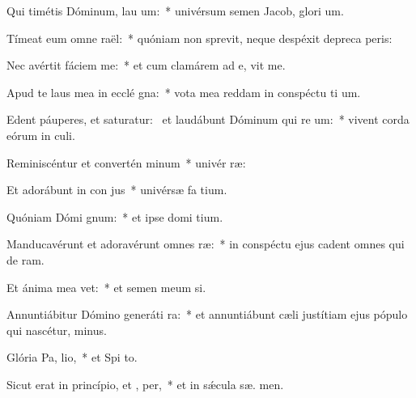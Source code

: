 \item Qui timétis Dóminum, lau um:~* univérsum semen Jacob, glori um.
\item Tímeat eum omne  raël:~* quóniam non sprevit, neque despéxit depreca peris:
\item Nec avértit fáciem   me:~* et cum clamárem ad e, vit me.
\item Apud te laus mea in ecclé gna:~* vota mea reddam in conspéctu ti um.
\item Edent páuperes, et saturatur:~\pscross{} et laudábunt Dóminum qui re um:~* vivent corda eórum in  culi.
\item Reminiscéntur et convertén  minum~* univér  ræ:
\item Et adorábunt in con jus~* univérsæ fa tium.
\item Quóniam Dómi  gnum:~* et ipse domi tium.
\item Manducavérunt et adoravérunt omnes  ræ:~* in conspéctu ejus cadent omnes qui de  ram.
\item Et ánima mea  vet:~* et semen meum  si.
\item Annuntiábitur Dómino generáti ra:~* et annuntiábunt cæli justítiam ejus pópulo qui nascétur,   minus.
\item Glória Pa,  lio,~* et Spi to.
\item Sicut erat in princípio, et ,  per,~* et in sǽcula sæ. men.
